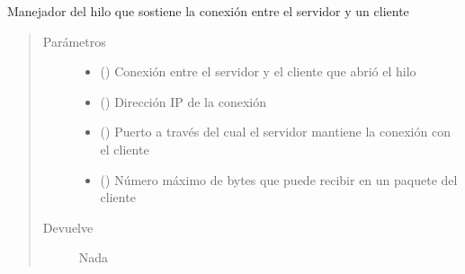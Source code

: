 \documentclass[letterpaper,10pt,spanish,openany,oneside]{sphinxmanual}
\begin{document}
\begin{fulllineitems}
\label{\detokenize{pokemonServer:pokemonServer.clientThread}}
Manejador del hilo que sostiene la conexión entre el servidor y un cliente
\begin{quote}\begin{description}
\item[{Parámetros}] \leavevmode\begin{itemize}
\item {} 
 () \textendash{} Conexión entre el servidor y el cliente que abrió el hilo

\item {} 
 () \textendash{} Dirección IP de la conexión

\item {} 
 () \textendash{} Puerto a través del cual el servidor mantiene la conexión con el cliente

\item {} 
 () \textendash{} Número máximo de bytes que puede recibir en un paquete del cliente

\end{itemize}

\item[{Devuelve}] \leavevmode
Nada

\end{description}\end{quote}

\end{fulllineitems}

\end{document}
